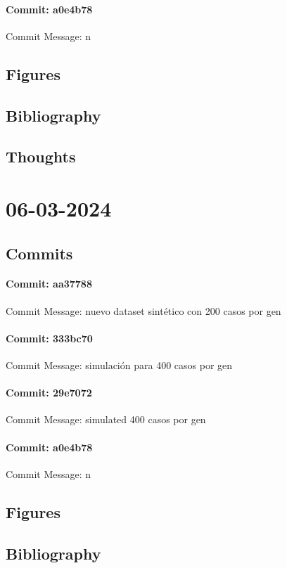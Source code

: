 \documentclass{article}
\begin{document}
\paragraph{Commit: a0e4b78}
Commit Message: n

\subsection{Figures}
\subsection{Bibliography}
\subsection{Thoughts}

\section{06-03-2024}
\subsection{Commits}
\paragraph{Commit: aa37788}
Commit Message: nuevo dataset sintético con 200 casos por gen

\paragraph{Commit: 333bc70}
Commit Message: simulación para 400 casos por gen

\paragraph{Commit: 29e7072}
Commit Message: simulated 400 casos por gen

\paragraph{Commit: a0e4b78}
Commit Message: n

\subsection{Figures}
\subsection{Bibliography}
\end{document}
